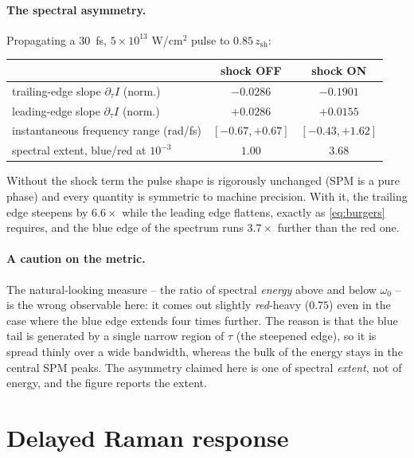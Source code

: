 \documentclass[11pt,a4paper]{article}
\begin{document}
\paragraph{The spectral asymmetry.} Propagating a $30$~fs, $5\times10^{13}$
W/cm$^2$ pulse to $0.85\,z_{\text{sh}}$:
\begin{center}
\begin{tabular}{lcc}
\toprule
 & shock OFF & shock ON \\
\midrule
trailing-edge slope $\partial_\tau I$ (norm.) & $-0.0286$ & $-0.1901$ \\
leading-edge slope $\partial_\tau I$ (norm.)  & $+0.0286$ & $+0.0155$ \\
instantaneous frequency range (rad/fs) & $[-0.67,+0.67]$ & $[-0.43,+1.62]$ \\
spectral extent, blue/red at $10^{-3}$ & $1.00$ & $3.68$ \\
\bottomrule
\end{tabular}
\end{center}
Without the shock term the pulse shape is rigorously unchanged (SPM is a pure
phase) and every quantity is symmetric to machine precision. With it, the
trailing edge steepens by $6.6\times$ while the leading edge flattens, exactly
as \eqref{eq:burgers} requires, and the blue edge of the spectrum runs
$3.7\times$ further than the red one.

\paragraph{A caution on the metric.} The natural-looking measure -- the ratio of
spectral \emph{energy} above and below $\omega_0$ -- is the wrong observable
here: it comes out slightly \emph{red}-heavy ($0.75$) even in the case where the
blue edge extends four times further. The reason is that the blue tail is
generated by a single narrow region of $\tau$ (the steepened edge), so it is
spread thinly over a wide bandwidth, whereas the bulk of the energy stays in the
central SPM peaks. The asymmetry claimed here is one of spectral \emph{extent},
not of energy, and the figure reports the extent.

\section{Delayed Raman response}
\end{document}
